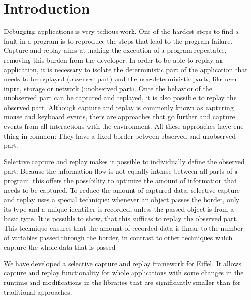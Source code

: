 \chapter{Introduction}
Debugging applications is very tedious work. One of the hardest steps to find a fault in a program is to reproduce the steps that lead to the program failure. Capture and replay aims at making the execution of a program repeatable, removing this burden from the developer. In order to be able to replay an application, it is necessary to isolate the deterministic part of the application that needs to be replayed (observed part) and the non-deterministic parts, like user input, storage or network (unobserved part). Once the behavior of the unobserved part can be captured and replayed, it is also possible to replay the observed part. Although capture and replay is commonly known as capturing mouse and keyboard events, there are approaches that go further and capture events from all interactions with the environment. All these approaches have one thing in common: They have a fixed border between observed and unobserved part.

Selective capture and replay \cite{orso05may} makes it possible to individually define the observed part. Because the information flow is not equally intense between all parts of a program, this offers the possibility to optimize the amount of information that needs to be captured. To reduce the amount of captured data, selective capture and replay uses a special technique: whenever an object passes the border, only its type and a unique identifier is recorded, unless the passed object is from a basic type. It is possible to show, that this suffices to replay the observed part. This technique ensures that the amount of recorded data is linear to the number of variables passed through the border, in contrast to other techniques which capture the whole data that is passed

We have developed a selective capture and replay framework for Eiffel. It allows capture and replay functionality for whole applications with some changes in the runtime and modifications in the libraries that are significantly smaller than for traditional approaches.

